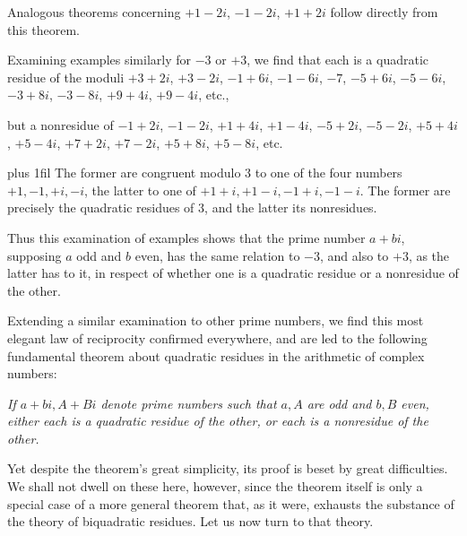 Analogous theorems concerning $+1-2i$, $-1-2i$, $+1+2i$ follow directly from this theorem.

Examining examples similarly for $-3$ or $+3$, we find that each is a quadratic residue of the moduli $+3+2i$, $+3-2i$,
%
$-1+6i$, $-1-6i$, $-7$, $-5+6i$, $-5-6i$, $-3+8i$, $-3-8i$, $+9+4i$, $+9-4i$, etc.,

but a nonresidue of $-1+2i$, $-1-2i$, $+1+4i$, $+1-4i$, $-5+2i$, $-5-2i$, $+5+4i$, $+5-4i$, $+7+2i$, $+7-2i$, $+5+8i$, $+5-8i$, etc.

\begingroup\rightskip=0pt plus 1fil\relax
The former are congruent modulo $3$ to one of the four numbers $+1,-1,+i,-i$, the latter to one of $+1+i,+1-i,-1+i,-1-i$. The former are precisely the quadratic residues of $3$, and the latter its nonresidues.\par\endgroup

Thus this examination of examples shows that the prime number $a+bi$, supposing $a$ odd and $b$ even, has the same relation to $-3$, and also to $+3$, as the latter has to it, in respect of whether one is a quadratic residue or a nonresidue of the other.

Extending a similar examination to other prime numbers, we find this most elegant law of reciprocity confirmed everywhere, and are led to the following fundamental theorem about quadratic residues in the arithmetic of complex numbers:

\emph{If $a+bi,A+Bi$ denote prime numbers such that $a,A$ are odd and $b,B$ even, either each is a quadratic residue of the other, or each is a nonresidue of the other.}

Yet despite the theorem's great simplicity, its proof is beset by great difficulties. We shall not dwell on these here, however, since the theorem itself is only a special case of a more general theorem that, as it were, exhausts the substance of the theory of biquadratic residues. Let us now turn to that theory.

